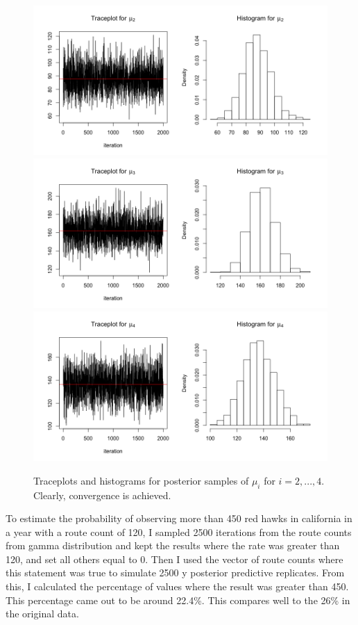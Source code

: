 \documentclass{asaproc}
\begin{document}
\begin{figure}
    \centering
    \includegraphics[scale = 0.5]{m2_mu2.png}
    \includegraphics[scale = 0.5]{m2_mu3.png}
    \includegraphics[scale = 0.5]{m2_mu4.png}
    \caption{Traceplots and histograms for posterior samples of $\mu_{i}$ for $i=2,...,4$. Clearly, convergence is achieved.}
    \label{m2mu2}
\end{figure}

To estimate the probability of observing more than 450 red hawks in california in a year with a route count of 120, I sampled 2500 iterations from the route counts from gamma distribution and kept the results where the rate was greater than 120, and set all others equal to 0. Then I used the vector of route counts where this statement was true to simulate 2500 y posterior predictive replicates. From this, I calculated the percentage of values where the result was greater than 450. This percentage came out to be around 22.4\%. This compares well to the 26\% in the original data.
\end{document}
